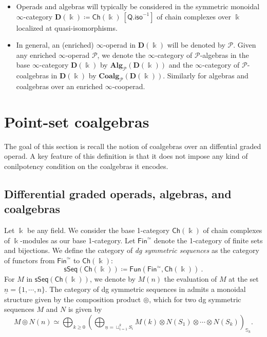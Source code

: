 \documentclass{proc-l}
\theoremstyle{plain}
\theoremstyle{definition}
\theoremstyle{remark}
\newcommand{\kk}{\Bbbk}
\begin{document}
\begin{itemize}
\item Operads and algebras will typically be considered in the symmetric monoidal $\infty$-category $\mathbf{D}(\kk) \coloneqq \mathsf{Ch}(\kk)~[\mathsf{Q.iso}^{-1}]$ of chain complexes over $\kk$ localized at  quasi-isomorphisms.

\item In general, an (enriched) $\infty$-operad in $\mathbf{D}(\kk)$ will be denoted by $\mathscr{P}$. Given any enriched $\infty$-operad $\mathscr{P}$, we denote the $\infty$-category of $\mathscr{P}$-algebras in the base $\infty$-category $\mathbf{D}(\kk)$ by $\mathbf{Alg}_{\mathscr{P}}(\mathbf{D}(\kk))$ and the $\infty$-category of $\mathscr{P}$-coalgebras in $\mathbf{D}(\kk)$ by $\mathbf{Coalg}_{\mathscr{P}}(\mathbf{D}(\kk))$. Similarly for algebras and coalgebras over an enriched $\infty$-cooperad.
\end{itemize}

\vspace{2pc}

\section{Point-set coalgebras}%
\label{Section:2}

\vspace{2.5pc}

The goal of this section is recall the notion of coalgebras over an diffential graded operad. A key feature of this definition is that it does not impose any kind of conilpotency condition on the coalgebras it encodes.

\subsection{Differential graded operads, algebras, and coalgebras}%
\label{Section:2.1}\label{sec:1-operads}
Let $\kk$ be any field. We consider the base 1-category $\mathsf{Ch}(\kk)$ of chain complexes of $\kk$-modules as our base 1-category. Let $\mathsf{Fin}^{\simeq}$ denote the 1-category of finite sets and bijections. We define the category of \textit{dg symmetric sequences} as the category of functors from $\mathsf{Fin}^{\simeq}$ to $\mathsf{Ch}(\kk)$:
\[
\mathsf{sSeq}(\mathsf{Ch}(\kk)) \coloneqq \mathsf{Fun}(\mathsf{Fin}^{\simeq},\mathsf{Ch}(\kk))~.
\]
For $M$ in $\mathsf{sSeq}(\mathsf{Ch}(\kk))$, we denote by $M(n)$ the evaluation of $M$ at the set $\underline{n}= \{1,\cdots,n\}$. The category of dg symmetric sequences in admits a monoidal structure given by the composition product $\circledcirc$, which for two dg symmetric sequences $M$ and $N$ is  given by
\[
M \circledcirc N(n) \simeq \bigoplus_{k \geq 0} \left(\bigoplus_{\underline{n} = \sqcup_{i=1}^k S_i} M(k) \otimes N(S_1) \otimes \cdots \otimes N(S_k)\right)_{\mathbb{S}_k} .
\]
\end{document}
